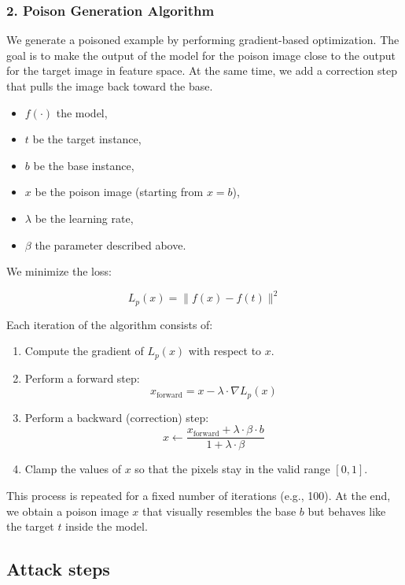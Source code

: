 \subsubsection*{2. Poison Generation Algorithm}

We generate a poisoned example by performing gradient-based optimization. The goal is to make the output of the model for the poison image close to the output for the target image in feature space. At the same time, we add a correction step that pulls the image back toward the base.

\begin{itemize}
    \item $f(\cdot)$ the model,
    \item $t$ be the target instance,
    \item $b$ be the base instance,
    \item $x$ be the poison image (starting from $x = b$),
    \item $\lambda$ be the learning rate,
    \item $\beta$ the parameter described above.
\end{itemize}

We minimize the loss:

\[
L_p(x) = \| f(x) - f(t) \|^2
\]

Each iteration of the algorithm consists of:
\begin{enumerate}
    \item Compute the gradient of $L_p(x)$ with respect to $x$.
    \item Perform a forward step:
    \[
    x_{\text{forward}} = x - \lambda \cdot \nabla L_p(x)
    \]
    \item Perform a backward (correction) step:
    \[
    x \leftarrow \frac{x_{\text{forward}} + \lambda \cdot \beta \cdot b}{1 + \lambda \cdot \beta}
    \]
    \item Clamp the values of $x$ so that the pixels stay in the valid range $[0, 1]$.
\end{enumerate}

This process is repeated for a fixed number of iterations (e.g., 100). At the end, we obtain a poison image $x$ that visually resembles the base $b$ but behaves like the target $t$ inside the model.

\subsection{Attack steps}

